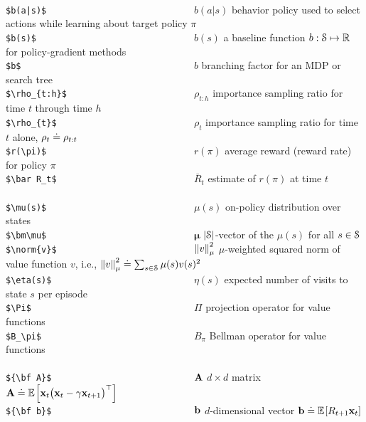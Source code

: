 \documentclass[10pt,fleqn]{article}
\begin{document}
\begin{tabbing}
\\
\>\verb+$b(a|s)$                             +\>$b(a|s)$            \> behavior policy used to select actions while learning about target policy $\pi$ \\
\>\verb+$b(s)$                               +\>$b(s)$              \> a baseline function $b:\S\mapsto\Re$ for policy-gradient methods\\
\>\verb+$b$                                  +\>$b$                 \> branching factor for an MDP or search tree \\
\>\verb+$\rho_{t:h}$                         +\>$\rho_{t:h}$        \> importance sampling ratio for time $t$ through time $h$ \\
\>\verb+$\rho_{t}$                           +\>$\rho_{t}$          \> importance sampling ratio for time $t$ alone, $\rho_t\defeq\rho_{t:t}$\\
\>\verb+$r(\pi)$                             +\>$r(\pi)$            \> average reward (reward rate) for policy $\pi$ \\
\>\verb+$\bar R_t$                           +\>$\bar R_t$          \> estimate of $r(\pi)$ at time $t$\\
\\
\>\verb+$\mu(s)$                             +\>$\mu(s)$            \> on-policy distribution over states \\
\>\verb+$\bm\mu$                             +\>$\bm\mu$            \> $|\S|$-vector of the $\mu(s)$ for all $s\in\S$\\
\>\verb+$\norm{v}$                           +\>$\norm{v}$          \> $\mu$-weighted squared norm of value function $v$, i.e., $\norm{v}\defeq\sum_{s\in\S} \mu(s)v(s)^2$\\
\>\verb+$\eta(s)$                            +\>$\eta(s)$           \> expected number of visits to state $s$ per episode\\
\>\verb+$\Pi$                                +\>$\Pi$               \> projection operator for value functions \\
\>\verb+$B_\pi$                              +\>$B_\pi$             \> Bellman operator for value functions \\
\\
\>\verb+${\bf A}$                            +\>${\bf A}$           \> $d\times d$ matrix ${\bf A}\defeq\E{\x_t\bigl(\x_t-\g\x_{t+1}\bigr)\tr}$\\
\>\verb+${\bf b}$                            +\>${\bf b}$           \> $d$-dimensional vector ${\bf b}\defeq\E{R_{t+1}\x_t}$\\

\end{tabbing}
\end{document}

